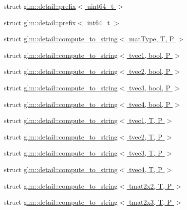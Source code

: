 \begin{DoxyCompactItemize}
\item 
struct \hyperlink{structglm_1_1detail_1_1prefix_3_01uint64__t_01_4}{glm\+::detail\+::prefix$<$ uint64\+\_\+t $>$}
\item 
struct \hyperlink{structglm_1_1detail_1_1prefix_3_01int64__t_01_4}{glm\+::detail\+::prefix$<$ int64\+\_\+t $>$}
\item 
struct \hyperlink{structglm_1_1detail_1_1compute__to__string}{glm\+::detail\+::compute\+\_\+to\+\_\+string$<$ mat\+Type, T, P $>$}
\item 
struct \hyperlink{structglm_1_1detail_1_1compute__to__string_3_01tvec1_00_01bool_00_01P_01_4}{glm\+::detail\+::compute\+\_\+to\+\_\+string$<$ tvec1, bool, P $>$}
\item 
struct \hyperlink{structglm_1_1detail_1_1compute__to__string_3_01tvec2_00_01bool_00_01P_01_4}{glm\+::detail\+::compute\+\_\+to\+\_\+string$<$ tvec2, bool, P $>$}
\item 
struct \hyperlink{structglm_1_1detail_1_1compute__to__string_3_01tvec3_00_01bool_00_01P_01_4}{glm\+::detail\+::compute\+\_\+to\+\_\+string$<$ tvec3, bool, P $>$}
\item 
struct \hyperlink{structglm_1_1detail_1_1compute__to__string_3_01tvec4_00_01bool_00_01P_01_4}{glm\+::detail\+::compute\+\_\+to\+\_\+string$<$ tvec4, bool, P $>$}
\item 
struct \hyperlink{structglm_1_1detail_1_1compute__to__string_3_01tvec1_00_01T_00_01P_01_4}{glm\+::detail\+::compute\+\_\+to\+\_\+string$<$ tvec1, T, P $>$}
\item 
struct \hyperlink{structglm_1_1detail_1_1compute__to__string_3_01tvec2_00_01T_00_01P_01_4}{glm\+::detail\+::compute\+\_\+to\+\_\+string$<$ tvec2, T, P $>$}
\item 
struct \hyperlink{structglm_1_1detail_1_1compute__to__string_3_01tvec3_00_01T_00_01P_01_4}{glm\+::detail\+::compute\+\_\+to\+\_\+string$<$ tvec3, T, P $>$}
\item 
struct \hyperlink{structglm_1_1detail_1_1compute__to__string_3_01tvec4_00_01T_00_01P_01_4}{glm\+::detail\+::compute\+\_\+to\+\_\+string$<$ tvec4, T, P $>$}
\item 
struct \hyperlink{structglm_1_1detail_1_1compute__to__string_3_01tmat2x2_00_01T_00_01P_01_4}{glm\+::detail\+::compute\+\_\+to\+\_\+string$<$ tmat2x2, T, P $>$}
\item 
struct \hyperlink{structglm_1_1detail_1_1compute__to__string_3_01tmat2x3_00_01T_00_01P_01_4}{glm\+::detail\+::compute\+\_\+to\+\_\+string$<$ tmat2x3, T, P $>$}
\item 

\end{DoxyCompactItemize}
